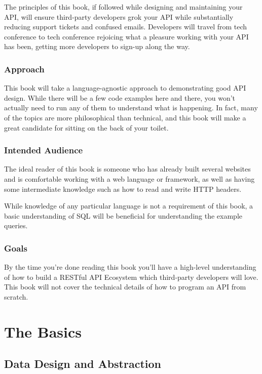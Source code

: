 \documentclass{book}
\begin{document}
The principles of this book, if followed while designing and maintaining your API, will ensure third-party developers grok your API while substantially reducing support tickets and confused emails. Developers will travel from tech conference to tech conference rejoicing what a pleasure working with your API has been, getting more developers to sign-up along the way.

\subsection*{Approach}

This book will take a language-agnostic approach to demonstrating good API design. While there will be a few code examples here and there, you won't actually need to run any of them to understand what is happening. In fact, many of the topics are more philosophical than technical, and this book will make a great candidate for sitting on the back of your toilet.

\subsection*{Intended Audience}

The ideal reader of this book is someone who has already built several websites and is comfortable working with a web language or framework, as well as having some intermediate knowledge such as how to read and write HTTP headers.

While knowledge of any particular language is not a requirement of this book, a basic understanding of SQL will be beneficial for understanding the example queries.

\subsection*{Goals}

By the time you're done reading this book you'll have a high-level understanding of how to build a RESTful API Ecosystem which third-party developers will love. This book will not cover the technical details of how to program an API from scratch.


\tableofcontents

\newpage


\chapter{The Basics}

\section{Data Design and Abstraction}
\end{document}
